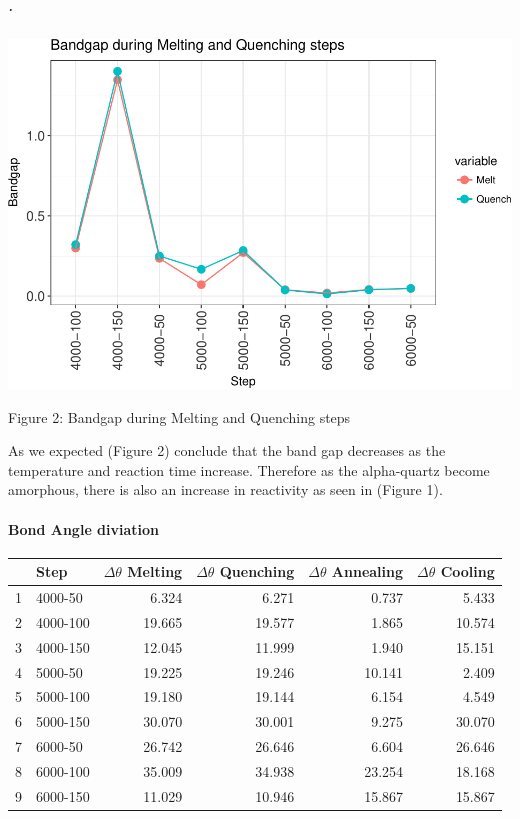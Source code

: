 \documentclass[]{article}
\let\oldparagraph\paragraph
\renewcommand{\paragraph}[1]{\oldparagraph{#1}\mbox{}}
\let\oldsubparagraph\subparagraph
\renewcommand{\subparagraph}[1]{\oldsubparagraph{#1}\mbox{}}
\begin{document}
\hypertarget{section-1}{%
\subparagraph{.}\label{section-1}}

\includegraphics{Report1_files/figure-latex/Graph: Bandgap Melt Quenching-1.pdf}

Figure 2: Bandgap during Melting and Quenching steps

As we expected (Figure 2) conclude that the band gap decreases as the
temperature and reaction time increase. Therefore as the alpha-quartz
become amorphous, there is also an increase in reactivity as seen in
(Figure 1).

\hypertarget{bond-angle-diviation}{%
\paragraph{Bond Angle diviation}\label{bond-angle-diviation}}

\begin{longtable}[]{@{}llrrrr@{}}
\toprule
& Step & \(\Delta\theta\) Melting & \(\Delta\theta\) Quenching &
\(\Delta\theta\) Annealing & \(\Delta\theta\) Cooling\tabularnewline
\midrule
\endhead
1 & 4000-50 & 6.324 & 6.271 & 0.737 & 5.433\tabularnewline
2 & 4000-100 & 19.665 & 19.577 & 1.865 & 10.574\tabularnewline
3 & 4000-150 & 12.045 & 11.999 & 1.940 & 15.151\tabularnewline
4 & 5000-50 & 19.225 & 19.246 & 10.141 & 2.409\tabularnewline
5 & 5000-100 & 19.180 & 19.144 & 6.154 & 4.549\tabularnewline
6 & 5000-150 & 30.070 & 30.001 & 9.275 & 30.070\tabularnewline
7 & 6000-50 & 26.742 & 26.646 & 6.604 & 26.646\tabularnewline
8 & 6000-100 & 35.009 & 34.938 & 23.254 & 18.168\tabularnewline
9 & 6000-150 & 11.029 & 10.946 & 15.867 & 15.867\tabularnewline
\bottomrule
\end{longtable}
\end{document}
